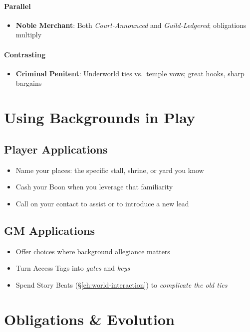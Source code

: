 \paragraph{Parallel}
\begin{itemize}
\item \textbf{Noble Merchant}: Both \textit{Court-Announced} and \textit{Guild-Ledgered}; obligations multiply
\end{itemize}

\paragraph{Contrasting}
\begin{itemize}
\item \textbf{Criminal Penitent}: Underworld ties vs.\ temple vows; great hooks, sharp bargains
\end{itemize}

\section{Using Backgrounds in Play}

\subsection*{Player Applications}
\begin{itemize}
\item Name your places: the specific stall, shrine, or yard you know
\item Cash your Boon when you leverage that familiarity
\item Call on your contact to assist or to introduce a new lead
\end{itemize}

\subsection*{GM Applications}
\begin{itemize}
\item Offer choices where background allegiance matters
\item Turn Access Tags into \emph{gates} and \emph{keys}
\item Spend Story Beats (\S\ref{ch:world-interaction}) to \emph{complicate the old ties}
\end{itemize}

\section{Obligations \& Evolution}
\label{sec:bg-obligation}

